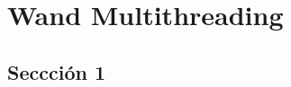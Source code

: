 \chapter{Wand Multithreading}
\label{capitulo:wandmth}



\section{Seccción 1}
\label{session1:primeraseccion}











